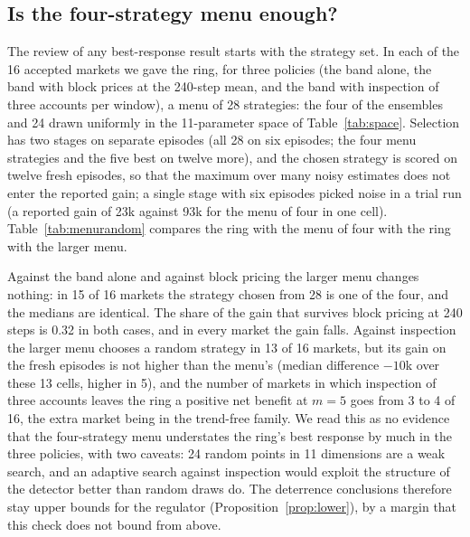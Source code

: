\subsection{Is the four-strategy menu enough?}\label{sec:menu}

The review of any best-response result starts with the strategy set. In each of the 16 accepted markets we gave the ring, for three policies (the band alone, the band with block prices at the 240-step mean, and the band with inspection of three accounts per window), a menu of 28 strategies: the four of the ensembles and 24 drawn uniformly in the 11-parameter space of Table~\ref{tab:space}. Selection has two stages on separate episodes (all 28 on six episodes; the four menu strategies and the five best on twelve more), and the chosen strategy is scored on twelve fresh episodes, so that the maximum over many noisy estimates does not enter the reported gain; a single stage with six episodes picked noise in a trial run (a reported gain of 23k against 93k for the menu of four in one cell). Table~\ref{tab:menurandom} compares the ring with the menu of four with the ring with the larger menu.

Against the band alone and against block pricing the larger menu changes nothing: in 15 of 16 markets the strategy chosen from 28 is one of the four, and the medians are identical. The share of the gain that survives block pricing at 240 steps is 0.32 in both cases, and in every market the gain falls. Against inspection the larger menu chooses a random strategy in 13 of 16 markets, but its gain on the fresh episodes is not higher than the menu's (median difference $-10$k over these 13 cells, higher in 5), and the number of markets in which inspection of three accounts leaves the ring a positive net benefit at $m=5$ goes from 3 to 4 of 16, the extra market being in the trend-free family. We read this as no evidence that the four-strategy menu understates the ring's best response by much in the three policies, with two caveats: 24 random points in 11 dimensions are a weak search, and an adaptive search against inspection would exploit the structure of the detector better than random draws do. The deterrence conclusions therefore stay upper bounds for the regulator (Proposition~\ref{prop:lower}), by a margin that this check does not bound from above.

